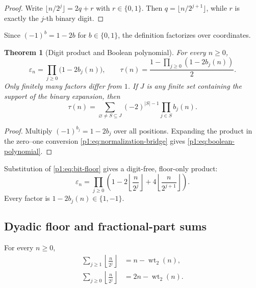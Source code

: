 \documentclass[11pt,oneside]{article}
\numberwithin{equation}{section}
\newtheorem{theorem}{Theorem}[section]
\theoremstyle{definition}
\theoremstyle{remark}
\newcommand{\wt}{\operatorname{wt}_2}
\newcommand{\eps}{\varepsilon}
\begin{document}
\begin{proof}
Write \(\lfloor n/2^j\rfloor=2q+r\) with \(r\in\{0,1\}\).  Then
\(q=\lfloor n/2^{j+1}\rfloor\), while \(r\) is exactly the \(j\)-th binary
digit.
\end{proof}

Since \((-1)^b=1-2b\) for \(b\in\{0,1\}\), the definition factorizes over
coordinates.

\begin{theorem}[Digit product and Boolean polynomial]
\label{p1:thm:digit-product}
For every \(n\ge0\),
\begin{equation}
  \boxed{
  \eps_n=\prod_{j\ge0}\bigl(1-2b_j(n)\bigr),
  \qquad
  \tau(n)=\frac{1-\prod_{j\ge0}(1-2b_j(n))}{2}.}
  \label{p1:eq:digit-product}
\end{equation}
Only finitely many factors differ from \(1\).  If \(J\) is any finite set
containing the support of the binary expansion, then
\begin{equation}
  \boxed{
  \tau(n)=\sum_{\varnothing\ne S\subseteq J}
     (-2)^{|S|-1}\prod_{j\in S}b_j(n).}
  \label{p1:eq:boolean-polynomial}
\end{equation}
\end{theorem}

\begin{proof}
Multiply \((-1)^{b_j}=1-2b_j\) over all positions.  Expanding the product in
the zero--one conversion \eqref{p1:eq:normalization-bridge} gives
\eqref{p1:eq:boolean-polynomial}.
\end{proof}

Substitution of \eqref{p1:eq:bit-floor} gives a digit-free, floor-only product:
\begin{equation}
  \eps_n=
  \prod_{j\ge0}
  \left(
    1-2\left\lfloor\frac{n}{2^j}\right\rfloor
      +4\left\lfloor\frac{n}{2^{j+1}}\right\rfloor
  \right).
  \label{p1:eq:pure-floor-product}
\end{equation}
Every factor is \(1-2b_j(n)\in\{1,-1\}\).

\subsection{Dyadic floor and fractional-part sums}

\begin{lemma}
\label{p1:lem:floor-sum}
For every \(n\ge0\),
\begin{align}
  \sum_{j\ge1}\left\lfloor\frac{n}{2^j}\right\rfloor
   &=n-\wt(n),
  \label{p1:eq:floor-sum}\\
  \sum_{j\ge0}\left\lfloor\frac{n}{2^j}\right\rfloor
   &=2n-\wt(n).
  \label{p1:eq:floor-sum-all}
\end{align}
\end{lemma}
\end{document}
